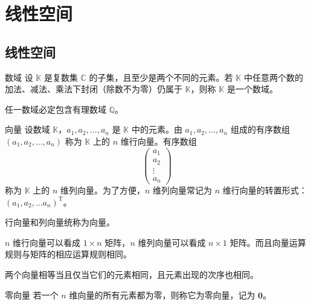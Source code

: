 \chapter{线性空间}


\section{线性空间}

\begin{definition}{数域}
  设 $\mathbb{K}$ 是复数集 $\mathbb{C}$ 的子集，且至少是两个不同的元素。若 $\mathbb{K}$ 中任意两个数的加法、减法、乘法下封闭（除数不为零）仍属于 $\mathbb{K}$，则称 $\mathbb{K}$ 是一个数域。
\end{definition}

\begin{theorem}
  任一数域必定包含有理数域 $\mathbb{Q}$。
\end{theorem}

\begin{definition}{向量}
  设数域 $\mathbb{K}$，$a_1,a_2, \ldots ,a_n$ 是 $\mathbb{K}$ 中的元素。由 $a_1,a_2, \ldots ,a_n$ 组成的有序数组 $(a_1,a_2, \ldots ,a_n)$ 称为 $\mathbb{K}$ 上的 $n$ 维行向量。有序数组
  \[
    \begin{pmatrix}
      a_1    \\
      a_2    \\
      \vdots \\
      a_n
    \end{pmatrix}
  \]
  称为 $\mathbb{K}$ 上的 $n$ 维列向量。为了方便，$n$ 维列向量常记为 $n$ 维行向量的转置形式：$(a_1,a_2, \ldots a_n)^{\mathrm{T}}$。

  行向量和列向量统称为向量。
\end{definition}

\begin{remark}
  $n$ 维行向量可以看成 $1 \times n$ 矩阵，$n$ 维列向量可以看成 $n \times 1$ 矩阵。而且向量运算规则与矩阵的相应运算规则相同。
\end{remark}

\begin{proposition}
  两个向量相等当且仅当它们的元素相同，且元素出现的次序也相同。
\end{proposition}

\begin{definition}{零向量}
  若一个 $n$ 维向量的所有元素都为零，则称它为零向量，记为 $\bm{0}$。
\end{definition}

